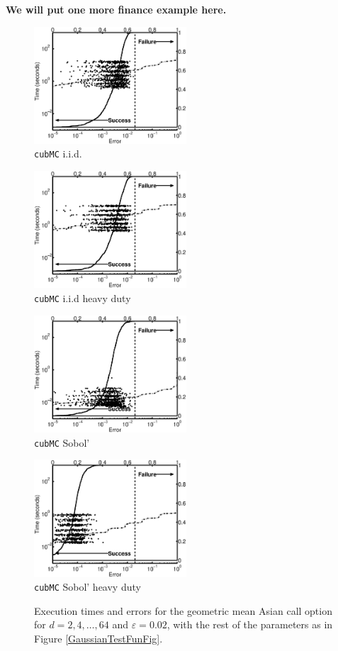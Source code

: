 \documentclass[graybox]{svmult}
\begin{document}
{\bf We will put one more finance example here.}


\begin{figure}
\centering
\begin{minipage}{5.7cm} \centering \includegraphics[width=5.7cm]{geomeaniidErrTime.eps} \\ {\tt cubMC} i.i.d. \end{minipage}
\begin{minipage}{5.7cm} \centering \includegraphics[width=5.7cm]{geomeaniidheavyErrTime.eps} \\ {\tt cubMC} i.i.d heavy duty \end{minipage}
\begin{minipage}{5.7cm} \centering \includegraphics[width=5.7cm]{geomeanSobolErrTime.eps} \\ {\tt cubMC} Sobol' \end{minipage}
\begin{minipage}{5.7cm} \centering \includegraphics[width=5.7cm]{geomeanSobolheavyErrTime.eps} \\ {\tt cubMC} Sobol' heavy duty \end{minipage}
\caption{Execution times and errors for the geometric mean Asian call option for $d=2, 4, \ldots, 64$ and $\varepsilon=0.02$, with the rest of the parameters as in Figure \ref{GaussianTestFunFig}.\label{GaussianTestFunHDFig}}
\end{figure}
\end{document}
